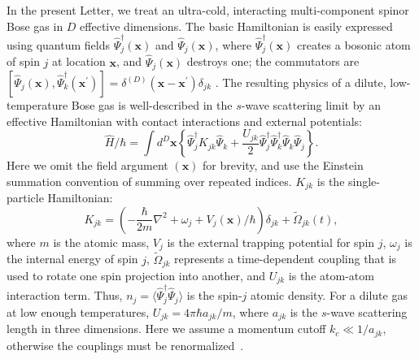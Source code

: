 \documentclass[aps,prl,twocolumn,showpacs,amsmath,amssymb,superscriptaddress,flushbottom,noraggedfooter]{revtex4-1}
\newcommand{\xvec}{\boldsymbol{x}}
\begin{document}
In the present Letter, we treat an ultra-cold,
interacting multi-component spinor Bose gas in $D$ effective dimensions.
The basic Hamiltonian is easily expressed using quantum fields
$\widehat{\Psi}_j^{\dagger}(\xvec)$ and $\widehat{\Psi}_j(\xvec)$,
where $\widehat{\Psi}_j^{\dagger}(\xvec)$ creates a bosonic atom of spin $j$
at location $\xvec$, and $\widehat{\Psi}_j(\xvec)$ destroys one;
the commutators are
$[\widehat{\Psi}_j(\xvec),\widehat{\Psi}_k^{\dagger}(\xvec^\prime)] =
\delta^{(D)}(\xvec-\xvec^\prime)\delta_{jk}\,\,.$
The resulting physics of a dilute, low-temperature Bose gas
is well-described in the $s$-wave scattering limit by an effective Hamiltonian
with contact interactions and external potentials:
\begin{equation}
	\hat{H} / \hbar = \int d^{D}\xvec \left\{
		\widehat{\Psi}_j^{\dagger} K_{jk} \widehat{\Psi}_k +
		\frac{U_{jk}}{2} \widehat{\Psi}_j^{\dagger} \widehat{\Psi}_k^{\dagger}
		\widehat{\Psi}_k \widehat{\Psi}_j
	\right\}.
\end{equation}
Here we omit the field argument $(\xvec)$ for brevity,
and use the Einstein summation convention of summing over repeated indices.
$K_{jk}$ is the single-particle Hamiltonian:
\begin{equation}
	K_{jk} = \left( -\frac{\hbar}{2m} \nabla^2 + \omega_j + V_j(\xvec) / \hbar \right) \delta_{jk} +
		\tilde{\Omega}_{jk}(t),
\end{equation}
where $m$ is the atomic mass, $V_j$ is the external trapping potential for spin $j$,
$\omega_j$ is the internal energy of spin $j$,
$\tilde{\Omega}_{jk}$ represents a time-dependent coupling
that is used to rotate one spin projection into another,
and $U_{jk}$ is the atom-atom interaction term.
Thus, $n_j = \langle \widehat{\Psi}_j^{\dagger} \widehat{\Psi}_j \rangle$
is the spin-$j$ atomic density.
For a dilute gas at low enough temperatures,
$U_{jk}=4\pi\hbar a_{jk} / m$, where $a_{jk}$ is the $s$-wave scattering length in three dimensions.
Here we assume a momentum cutoff $k_{c} \ll 1 / a_{jk}$,
otherwise the couplings must be renormalized~\cite{Sinatra2002}.
\end{document}

